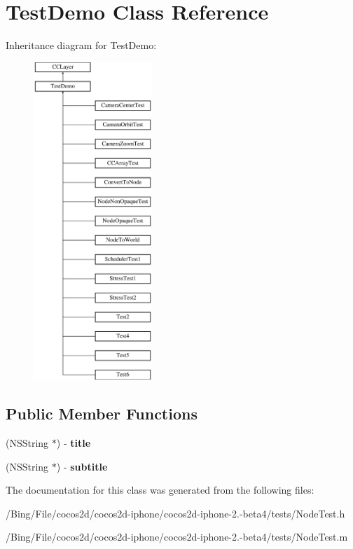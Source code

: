 \hypertarget{interface_test_demo}{\section{Test\-Demo Class Reference}
\label{interface_test_demo}
}
Inheritance diagram for Test\-Demo\-:\begin{figure}[H]
\begin{center}
\leavevmode
\includegraphics[height=12.000000cm]{interface_test_demo}
\end{center}
\end{figure}
\subsection*{Public Member Functions}
\begin{DoxyCompactItemize}
\item 
\hypertarget{interface_test_demo_a0a807619233641378e622680a6da0499}{(N\-S\-String $\ast$) -\/ {\bfseries title}}\label{interface_test_demo_a0a807619233641378e622680a6da0499}

\item 
\hypertarget{interface_test_demo_adf2fbde0addfd232c3af2597641b1805}{(N\-S\-String $\ast$) -\/ {\bfseries subtitle}}\label{interface_test_demo_adf2fbde0addfd232c3af2597641b1805}

\end{DoxyCompactItemize}


The documentation for this class was generated from the following files\-:\begin{DoxyCompactItemize}
\item 
/\-Bing/\-File/cocos2d/cocos2d-\/iphone/cocos2d-\/iphone-\/2.-\/beta4/tests/Node\-Test.\-h\item 
/\-Bing/\-File/cocos2d/cocos2d-\/iphone/cocos2d-\/iphone-\/2.-\/beta4/tests/Node\-Test.\-m\end{DoxyCompactItemize}
